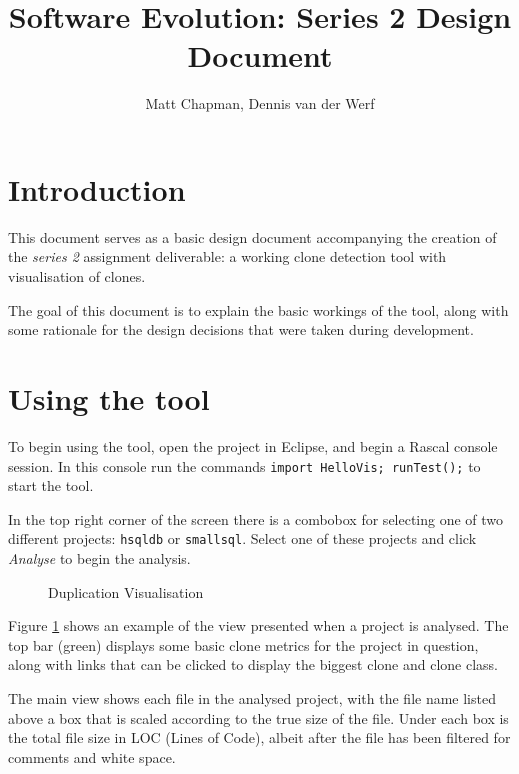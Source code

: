 \documentclass{article}
\title{Software Evolution: Series 2 Design Document}
\author{Matt Chapman, Dennis van der Werf}
\begin{document}
\maketitle
\section{Introduction}

This document serves as a basic design document accompanying the creation of the \textit{series 2} assignment deliverable: a working clone detection tool with visualisation of clones.

The goal of this document is to explain the basic workings of the tool, along with some rationale for the design decisions that were taken during development.

\section{Using the tool}
To begin using the tool, open the project in Eclipse, and begin a Rascal console session. In this console run the commands \texttt{import HelloVis; runTest();} to start the tool.

In the top right corner of the screen there is a combobox for selecting one of two different projects: \texttt{hsqldb} or \texttt{smallsql}. Select one of these projects and click \textit{Analyse} to begin the analysis.

\begin{figure}[h]
\centering
{}
\caption{Duplication Visualisation}
\label{fig:shot1}
\end{figure}

Figure \ref{fig:shot1} shows an example of the view presented when a project is analysed. The top bar (green) displays some basic clone metrics for the project in question, along with links that can be clicked to display the biggest clone and clone class.

The main view shows each file in the analysed project, with the file name listed above a box that is scaled according to the true size of the file. Under each box is the total file size in LOC (Lines of Code), albeit after the file has been filtered for comments and white space.
\end{document}
